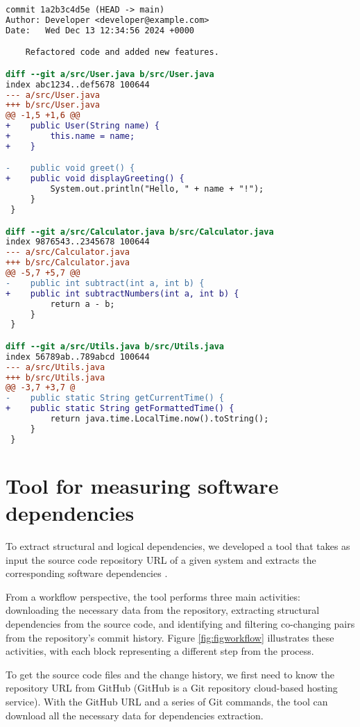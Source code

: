 \begin{lstlisting}[language=diff, caption={Example output of \texttt{git diff} between two commits.}, label={lst:git_diff}]
commit 1a2b3c4d5e (HEAD -> main)
Author: Developer <developer@example.com>
Date:   Wed Dec 13 12:34:56 2024 +0000

    Refactored code and added new features.

diff --git a/src/User.java b/src/User.java
index abc1234..def5678 100644
--- a/src/User.java
+++ b/src/User.java
@@ -1,5 +1,6 @@
+    public User(String name) {
+        this.name = name;
+    }

-    public void greet() {
+    public void displayGreeting() {
         System.out.println("Hello, " + name + "!");
     }
 }

diff --git a/src/Calculator.java b/src/Calculator.java
index 9876543..2345678 100644
--- a/src/Calculator.java
+++ b/src/Calculator.java
@@ -5,7 +5,7 @@ 
-    public int subtract(int a, int b) {
+    public int subtractNumbers(int a, int b) {
         return a - b;
     }
 }

diff --git a/src/Utils.java b/src/Utils.java
index 56789ab..789abcd 100644
--- a/src/Utils.java
+++ b/src/Utils.java
@@ -3,7 +3,7 @
-    public static String getCurrentTime() {
+    public static String getFormattedTime() {
         return java.time.LocalTime.now().toString();
     }
 }
\end{lstlisting}




\section{Tool for measuring software dependencies}
\label{subsec:tool_measuring_dependencies}

\hspace{4em}To extract structural and logical dependencies, we developed a tool that takes as input the source code repository URL of a given system and extracts the corresponding software dependencies \cite{DepSACI, enase19}. 

From a workflow perspective, the tool performs three main activities: downloading the necessary data from the repository, extracting structural dependencies from the source code, and identifying and filtering co-changing pairs from the repository's commit history. Figure \ref{fig:figworkflow} illustrates these activities, with each block representing a different step from the process.


To get the source code files and the change history, we first need to know the repository URL from GitHub (GitHub is a Git repository cloud-based hosting service). With the GitHub URL and a series of Git commands, the tool can download all the necessary data for dependencies extraction.

